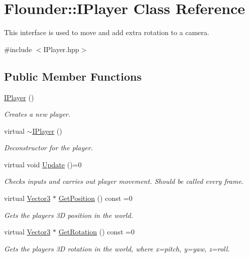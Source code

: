 \hypertarget{class_flounder_1_1_i_player}{}\section{Flounder\+:\+:I\+Player Class Reference}
\label{class_flounder_1_1_i_player}


This interface is used to move and add extra rotation to a camera.  




{\ttfamily \#include $<$I\+Player.\+hpp$>$}

\subsection*{Public Member Functions}
\begin{DoxyCompactItemize}
\item 
\hyperlink{class_flounder_1_1_i_player_aa2ebd0f75bd762c074f11b4ad85379b6}{I\+Player} ()
\begin{DoxyCompactList}\small\item\em Creates a new player. \end{DoxyCompactList}\item 
virtual \hyperlink{class_flounder_1_1_i_player_a254b93f0348cc309fc0a2340999acc21}{$\sim$\+I\+Player} ()
\begin{DoxyCompactList}\small\item\em Deconstructor for the player. \end{DoxyCompactList}\item 
virtual void \hyperlink{class_flounder_1_1_i_player_aa1f0636f26824c08409370769d63d570}{Update} ()=0
\begin{DoxyCompactList}\small\item\em Checks inputs and carries out player movement. Should be called every frame. \end{DoxyCompactList}\item 
virtual \hyperlink{class_flounder_1_1_vector3}{Vector3} $\ast$ \hyperlink{class_flounder_1_1_i_player_ac1e883eba1ff62e24b05b4f82964dffe}{Get\+Position} () const =0
\begin{DoxyCompactList}\small\item\em Gets the players 3D position in the world. \end{DoxyCompactList}\item 
virtual \hyperlink{class_flounder_1_1_vector3}{Vector3} $\ast$ \hyperlink{class_flounder_1_1_i_player_afbc9c1d2a367f1a9407554f5614775b6}{Get\+Rotation} () const =0
\begin{DoxyCompactList}\small\item\em Gets the players 3D rotation in the world, where x=pitch, y=yaw, z=roll. \end{DoxyCompactList}\end{DoxyCompactItemize}


